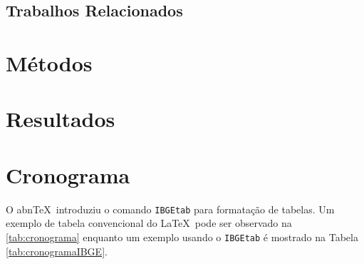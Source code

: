 \documentclass[
	12pt,				    %
	openright,			    %
	oneside,			    %
	a4paper,			    %
    sumario=tradicional,    %
	english,			    %
	brazil,				    %
	]{abntex2}
\begin{document}
\section{Trabalhos Relacionados}\label{sec:TrabRel}

\chapter{Métodos}\label{sec:metodos}\thispagestyle{empty}

\chapter{Resultados}\label{sec:resultados}\thispagestyle{empty}

\chapter{Cronograma}\label{sec:cronograma}\thispagestyle{empty}
O abn\TeX\ introduziu o comando \texttt{IBGEtab} para formatação de tabelas. Um exemplo de tabela convencional do \LaTeX\ pode ser observado na \autoref{tab:cronograma} enquanto um exemplo usando o \texttt{IBGEtab} é mostrado na Tabela \ref{tab:cronogramaIBGE}.
\end{document}
